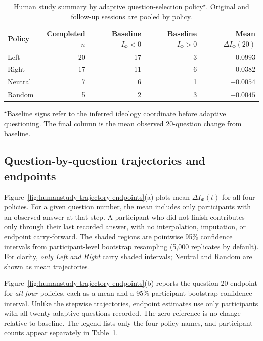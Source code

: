 \begin{table}[!t]
\centering
\caption{Human study summary by adaptive question-selection policy$^\star$.
Original and follow-up sessions are pooled by policy.}
\label{tab:humanstudy-participants}
\small
\setlength{\tabcolsep}{11pt}
\begin{tabular}{lrrrr}
\toprule
Policy & Completed $n$ & Baseline $I_\Phi<0$ & Baseline $I_\Phi>0$ & Mean $\Delta I_\Phi(20)$ \\
\midrule
Left & 20 & 17 & 3 & $-0.0993$ \\
Right & 17 & 11 & 6 & $+0.0382$ \\
Neutral & 7 & 6 & 1 & $-0.0054$ \\
Random & 5 & 2 & 3 & $-0.0045$ \\
\bottomrule
\end{tabular}
\flushleft $^\star$Baseline signs refer to the inferred ideology
coordinate before adaptive questioning. The final column is
the mean observed 20-question change from baseline.
\end{table}

\subsection{Question-by-question trajectories and endpoints}
Figure~\ref{fig:humanstudy-trajectory-endpoints}(a) plots mean
$\Delta I_\Phi(t)$ for all four policies. For a given question number,
the mean includes only participants with an observed answer at that
step. A participant who did not finish contributes only through their
last recorded answer, with no interpolation, imputation, or endpoint
carry-forward. The shaded regions are pointwise 95\% confidence
intervals from participant-level bootstrap resampling (5{,}000
replicates by default). For clarity, \emph{only Left and Right} carry
shaded intervals; Neutral and Random are shown as mean trajectories.

Figure~\ref{fig:humanstudy-trajectory-endpoints}(b) reports the
question-20 endpoint for \emph{all four} policies, each as a mean
and a 95\% participant-bootstrap confidence interval. Unlike the
stepwise trajectories, endpoint estimates use only participants with
all twenty adaptive questions recorded. The zero reference is no
change relative to baseline. The legend lists only the four policy
names, and participant counts appear separately in
Table~\ref{tab:humanstudy-participants}.



